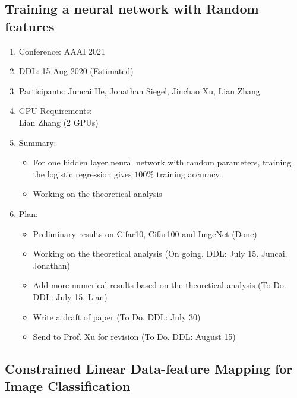 \subsection{Training a neural network with Random features}

\begin{enumerate}
	\item Conference: AAAI 2021
	\item DDL: 15 Aug 2020 (Estimated)
	\item Participants: Juncai He, Jonathan Siegel, Jinchao Xu, Lian Zhang
	\item GPU Requirements: \\
	Lian Zhang (2 GPUs)\\

	
	\item Summary: 
	\begin{itemize}
		\item For one hidden layer neural network with random parameters, training the logistic regression gives $100\%$ training accuracy.
		\item Working on the theoretical analysis
	\end{itemize}
	\item Plan:
	\begin{itemize}
		\item Preliminary results on Cifar10, Cifar100 and ImgeNet (Done)
		\item Working on the theoretical analysis (On going. DDL: July 15. Juncai, Jonathan)
		\item Add more numerical results based on the theoretical analysis (To Do. DDL: July 15. Lian)
		\item Write a draft of paper (To Do. DDL: July 30)
		\item Send to Prof. Xu for revision (To Do. DDL: August 15)
	\end{itemize}
\end{enumerate}



\subsection{Constrained Linear Data-feature Mapping for Image Classification}

